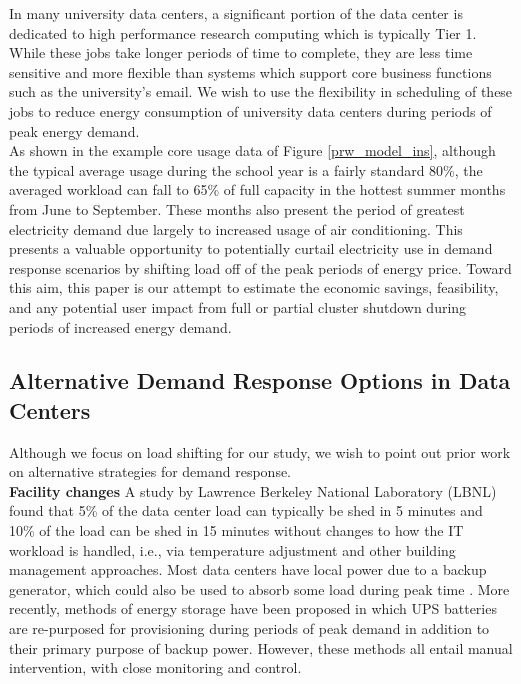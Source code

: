 In many university data centers, a significant portion of the data center is dedicated to high performance research computing which is typically Tier 1. While these jobs take longer periods of time to complete, they are less time sensitive and more flexible than systems which support core business functions such as the university's email.  We wish to use the flexibility in scheduling of these jobs to reduce energy consumption of university data centers during periods of peak energy demand. \\  

As shown in the example core usage data of Figure \ref{prw_model_ins}, although the typical average usage during the school year is a fairly standard 80\%, the averaged workload can fall to 65\% of full capacity in the hottest summer months from June to September. These months also present the period of greatest electricity demand due largely to increased usage of air conditioning. This presents a valuable opportunity to potentially curtail electricity use in demand response scenarios by shifting load off of the peak periods of energy price.  Toward this aim, this paper is our attempt to estimate the economic savings, feasibility, and any potential user impact from full or partial cluster shutdown during periods of increased energy demand.


\subsection{Alternative Demand Response Options in Data Centers}

Although we focus on load shifting for our study, we wish to point out prior work on alternative strategies for demand response. \\

\textbf{Facility changes} A study by Lawrence Berkeley National Laboratory (LBNL) found that 5\% of the data center load can typically be shed in 5 minutes and 10\% of the load can be shed in 15 minutes without changes to how the IT workload is handled, i.e., via temperature adjustment and other building management approaches\cite{Ghatikar2012}. Most data centers have local power due to a backup generator, which could also be used to absorb some load during peak time \cite{Liu2013}. More recently, methods of energy storage have been proposed\cite{Narayanan2014} in which UPS batteries are re-purposed for provisioning during periods of peak demand in addition to their primary purpose of backup power. However, these methods all entail manual intervention, with close monitoring and control.

